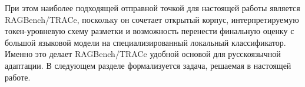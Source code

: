 При этом наиболее подходящей отправной точкой для настоящей работы является 
RAGBench/TRACe, поскольку он сочетает открытый корпус, интерпретируемую 
токен-уровневую схему разметки и возможность перенести финальную оценку 
с большой языковой модели на специализированный локальный классификатор. 
Именно это делает RAGBench/TRACe удобной основой для русскоязычной адаптации. 
В следующем разделе формализуется задача, решаемая в настоящей работе.
